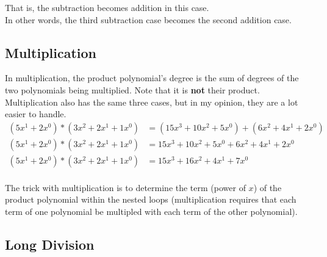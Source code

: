 \documentclass[12pt]{article}
\begin{document}
\noindent That is, the subtraction becomes addition in this case. \\

\noindent In other words, the third subtraction case becomes the second addition case. \\










\newpage
{}
\subsection*{Multiplication}

\noindent In multiplication, the product polynomial's degree is the sum of degrees of the two polynomials being 
multiplied. Note that it is \textbf{not} their product. \\

\noindent Multiplication also has the same three cases, but in my opinion, they are a lot easier to handle. \\

\begin{align*}
    (5x^1 + 2x^0) * (3x^2 + 2x^1 + 1x^0) &= (15x^3 + 10x^2 + 5x^0) + (6x^2 + 4x^1 + 2x^0) \\
    (5x^1 + 2x^0) * (3x^2 + 2x^1 + 1x^0) &= 15x^3 + 10x^2 + 5x^0 + 6x^2 + 4x^1 + 2x^0 \\
    (5x^1 + 2x^0) * (3x^2 + 2x^1 + 1x^0) &= 15x^3 + 16x^2 + 4x^1 + 7x^0 \\
\end{align*}

\noindent The trick with multiplication is to determine the term (power of $x$) of the product polynomial within the 
nested loops (multiplication requires that each term of one polynomial be multipled with each term of the other 
polynomial). \\






\newpage
{}
\subsection*{Long Division}
\end{document}
